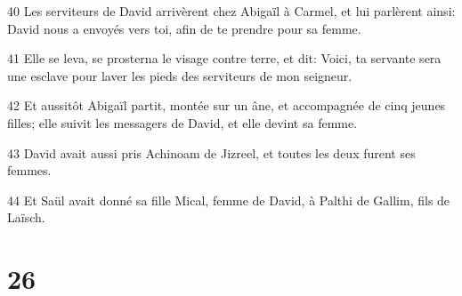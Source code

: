 \par 40 Les serviteurs de David arrivèrent chez Abigaïl à Carmel, et lui parlèrent ainsi: David nous a envoyés vers toi, afin de te prendre pour sa femme.
\par 41 Elle se leva, se prosterna le visage contre terre, et dit: Voici, ta servante sera une esclave pour laver les pieds des serviteurs de mon seigneur.
\par 42 Et aussitôt Abigaïl partit, montée sur un âne, et accompagnée de cinq jeunes filles; elle suivit les messagers de David, et elle devint sa femme.
\par 43 David avait aussi pris Achinoam de Jizreel, et toutes les deux furent ses femmes.
\par 44 Et Saül avait donné sa fille Mical, femme de David, à Palthi de Gallim, fils de Laïsch.

\chapter{26}

